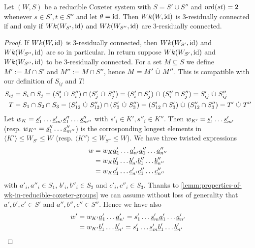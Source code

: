 \begin{theo}
	Let $(W,S)$ be a reducible Coxeter system with $S = S' \cup S''$ and $\operatorname{ord}(st) = 2$ whenever $s \in S', t \in S''$ and let $\theta = \operatorname{id}$. Then $Wk(W,\operatorname{id})$ is 3-residually connected if and only if $Wk(W_{S'},\operatorname{id})$ and $Wk(W_{S''},\operatorname{id})$ are 3-residually connected.

	\begin{proof}
		If $Wk(W,\operatorname{id})$ is 3-residually connected, then $Wk(W_{S'},\operatorname{id})$ and $Wk(W_{S''},\operatorname{id})$ are so in particular. In return suppose $Wk(W_{S'},\operatorname{id})$ and $Wk(W_{S''},\operatorname{id})$ to be 3-residually connected. For a set $M \subseteq S$ we define $M' := M \cap S'$ and $M'' := M \cap S''$, hence $M = M' \ \dot \cup \  M''$. This is compatible with our definition of $S_{ij}$ and $T$:
		\begin{align*}
			S_{ij}	& = S_i \cap S_j = (S'_i \ \dot \cup \  S''_i) \cap (S'_j \ \dot \cup \  S''_j) = (S'_i \cap S'_j) \ \dot \cup \  (S''_i \cap S''_j) = S'_{ij} \ \dot \cup \  S''_{ij} \\
			T		& = S_1 \cap S_2 \cap S_3 = (S'_{12} \ \dot \cup \  S''_{12}) \cap (S'_3 \ \dot \cup \  S''_3) = (S'_{12} \cap S'_3) \ \dot \cup \  (S''_{12} \cap S''_3) = T' \ \dot \cup \  T''
		\end{align*}
		Let $w_K = \underline{s}'_1 \ldots \underline{s}'_{m'} \underline{s}''_1 \ldots \underline{s}''_{m''}$ with $s'_i \in K',s''_i \in K''$. Then
		$w_{K'} = \underline{s}'_1 \ldots \underline{s}'_{m'}$ (resp. $w_{K''} = \underline{s}''_1 \ldots \underline{s}''_{m''}$) is the corrosponding longest elements in $\langle K' \rangle \leq W_{S'} \leq W$ (resp. $\langle K'' \rangle \leq W_{S''} \leq W$).
		We have three twisted expressions
		\begin{align*}
			w	& = w_K \underline{a}'_1 \ldots \underline{a}'_{n'} \underline{a}''_1 \ldots \underline{a}''_{n''} \\
				& = w_K \underline{b}'_1 \ldots \underline{b}'_{n'} \underline{b}''_1 \ldots \underline{b}''_{n''} \\
				& = w_K \underline{c}'_1 \ldots \underline{c}'_{n'} \underline{c}''_1 \ldots \underline{c}''_{n''}
		\end{align*}
		with $a'_i,a''_i \in S_1$, $b'_i,b''_i \in S_2$ and $c'_i,c''_i \in S_3$. Thanks to \ref{lemm:properties-of-wk-in-reducible-coxeter-groups} we can assume without loss of generality that $a',b',c' \in S'$ and $a'',b'',c'' \in S''$. Hence we have also
		\begin{align*}
			w'	& = w_{K'} \ul a'_1 \ldots \ul a'_{n'} = s'_1 \ldots \ul s'_m \ul a'_1 \ldots \ul a'_{n'} \\
				& = w_{K'} \ul b'_1 \ldots \ul b'_{n'} = s'_1 \ldots \ul s'_m \ul b'_1 \ldots \ul b'_{n'} \\

\end{align*}
\end{proof}
\end{theo}
